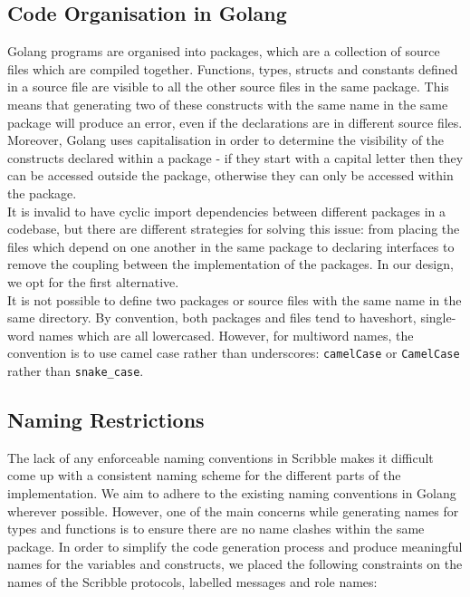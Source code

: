 \documentclass[12pt,twoside]{report}
\begin{document}
\subsection{Code Organisation in Golang}

Golang programs are organised into packages, which are a collection of source files which are compiled together. Functions, types, structs and constants defined in a source file are visible to all the other source files in the same package\cite{godocs}. This means that generating two of these constructs with the same name in the same package will produce an error, even if the declarations are in different source files. Moreover, Golang uses capitalisation in order to determine the visibility of the constructs declared within a package - if they start with a capital letter then they can be accessed outside the package, otherwise they can only be accessed within the package.\\

It is invalid to have cyclic import dependencies between different packages in a codebase, but there are different strategies for solving this issue: from placing the files which depend on one another in the same package to declaring interfaces to remove the coupling between the implementation of the packages. In our design, we opt for the first alternative.\\

It is not possible to define two packages or source files with the same name in the same directory. By convention, both packages and files tend to haveshort, single-word names which are all lowercased. However, for multiword names, the convention is to use camel case rather than underscores: \texttt{camelCase} or \texttt{CamelCase} rather than \texttt{snake\_case}.\\

\subsection{Naming Restrictions}\label{naming-restrictions}

The lack of any enforceable naming conventions in Scribble makes it difficult come up with a consistent naming scheme for the different parts of the implementation. We aim to adhere to the existing naming conventions in Golang wherever possible. However, one of the main concerns while generating names for types and functions is to ensure there are no name clashes within the same package. In order to simplify the code generation process and produce meaningful names for the variables and constructs, we placed the following constraints on the names of the Scribble protocols, labelled messages and role names:
\end{document}

